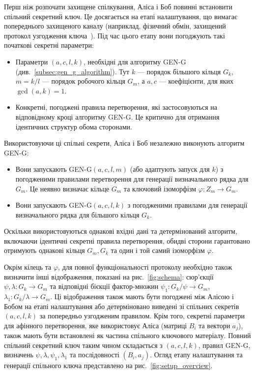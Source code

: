 Перш ніж розпочати захищене спілкування, Аліса і Боб повинні встановити спільний секретний ключ.
Це досягається на етапі налаштування, що вимагає попереднього захищеного каналу (наприклад, фізичний обмін, захищений протокол узгодження ключа~\cite{DiffieHellman76}).
Під час цього етапу вони погоджують такі початкові секретні параметри:
\begin{itemize}
    \item Параметри $(a, c, l, k)$, необхідні для алгоритму GEN-G (див.~\ref{subsec:gen_g_algorithm}).
    Тут $k$ — порядок більшого кільця $G_k$, $m = k/l$ — порядок робочого кільця $G_m$, а $a, c$ — коефіцієнти, для яких $\gcd(a, k) = 1$.
    \item Конкретні, погоджені правила перетворення, які застосовуються на відповідному кроці алгоритму GEN-G.
    Це критично для отримання ідентичних структур обома сторонами.
\end{itemize}
Використовуючи ці спільні секрети, Аліса і Боб незалежно виконують алгоритм GEN-G:
\begin{itemize}
    \item Вони запускають GEN-G$(a, c, l, m)$ (або адаптують запуск для $k$) з погодженими правилами перетворення для генерації визначального рядка для $G_m$.
    Це неявно визначає кільце $G_m$ та ключовий ізоморфізм $\varphi: Z_m \to G_m$.
    \item Вони запускають GEN-G$(a, c, l, k)$ з погодженими правилами для генерації визначального рядка для більшого кільця $G_k$.
\end{itemize}
Оскільки використовуються однакові вхідні дані та детермінований алгоритм, включаючи ідентичні секретні правила перетворення, обидві сторони гарантовано отримують однакові кільця $G_m, G_k$ та один і той самий ізоморфізм $\varphi$.

Окрім кілець та $\varphi$, для повної функціональності протоколу необхідно також визначити інші відображення, показані на рис.~\ref{fig:schema}: сюр'єкції $\psi, \lambda: G_k \to G_m$ та відповідні бієкції фактор-множин $\psi_1: G_k/\psi \to G_m$, $\lambda_1: G_k/\lambda \to G_m$.
Ці відображення також мають бути погоджені між Алісою і Бобом на етапі налаштування або детерміновано виведені зі спільних секретів $(a,c,l,k)$ за попередньо узгодженим правилом.
Крім того, секретні параметри для афінного перетворення, яке використовує Аліса (матриці $B_i$ та вектори $a_j$), також мають бути встановлені як частина спільного ключового матеріалу.
Повний спільний секретний ключ таким чином складається з $(a,c,l,k)$, правил GEN-G, визначень $\psi, \lambda, \psi_1, \lambda_1$ та послідовності $(B_i, a_j)$. Огляд етапу налаштування та генерації спільного ключа представлено на рис.~\ref{fig:setup_overview}.

